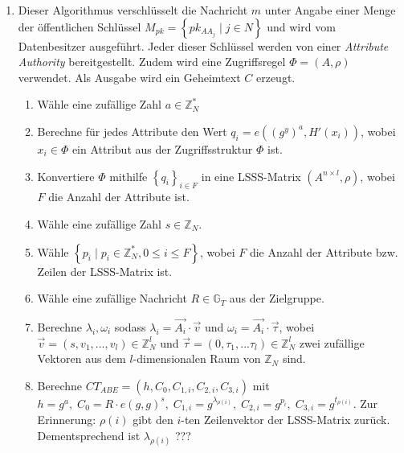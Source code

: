 \begin{enumerate}
	\item {} Dieser Algorithmus
		ver\-schlüs\-selt die Nachricht $m$ unter Angabe einer Menge der
		öffent\-lich\-en Schlüssel $M_{pk} = \left\{ pk_{AA_j} \;\vert\; j \in N
			\right\}$ und wird vom Datenbesitzer ausgeführt. Jeder dieser Schlüssel
			werden von einer \textit{Attribute Authority} bereitgestellt. Zudem wird
			eine Zugriffsregel $\Phi = \left( A, \rho \right)$ verwendet. Als Ausgabe
			wird ein Geheimtext $C$ erzeugt.
		\begin{enumerate}
			\item Wähle eine zufällige Zahl $a \in \mathbb{Z}^*_N$
			\item Berechne für jedes Attribute den Wert $q_i = e((g^y)^a, H'(x_i))$,
				wobei $x_i \in \Phi$ ein Attribut
				aus der Zugriffsstruktur $\Phi$ ist.
			\item Konvertiere $\Phi$ mithilfe $\left\{q_i\right\}_{i \in F}$ in eine
				LSSS-Matrix $\left( A^{n \times l}, \rho \right)$, wobei $F$ die Anzahl
				der Attribute ist.
			\item Wähle eine zufällige Zahl $s \in \mathbb{Z}_N$.
			\item Wähle $\left\{ p_i \;\vert\; p_i \in \mathbb{Z}^*_N, 0 \leq i \le F
				\right\}$, wobei $F$ die Anzahl der Attribute bzw. Zeilen der
				LSSS-Matrix ist.
			\item Wähle eine zufällige Nachricht $R \in \mathbb{G}_T$ aus der
				Zielgruppe.
			\item Berechne $\lambda_i, \omega_i$ sodass $\lambda_i = \vec{A_i} \cdot
				\vec{v}$ und $\omega_i = \vec{A_i} \cdot \vec{\tau}$, wobei $\vec{v} =
				\left( s, v_1, ..., v_l \right) \in \mathbb{Z}^l_N$ und $\vec{\tau} =
				\left( 0, \tau_1, ... \tau_l \right) \in \mathbb{Z}^l_N$ zwei zufällige
				Vektoren aus dem $l$-dimensionalen Raum von $\mathbb{Z}_N$ sind.
			\item Berechne $CT_{ABE} = \left(h, C_0, C_{1,i}, C_{2,i}, C_{3,i}\right)$
				mit \\
				$h = g^a, \; C_0 = R \cdot e(g, g)^s, \; C_{1,i} =
				g^{\lambda_{\rho(i)}}, \; C_{2,i} = g^{p_i}, \; C_{3,i} =
				g^{t_{\rho(i)}}$. Zur Erinnerung: $\rho(i)$ gibt den $i$-ten
				Zeilenvektor der LSSS-Matrix zurück. Dementsprechend ist
				$\lambda_{\rho(i)}$ ???
		\end{enumerate}


\end{enumerate}
